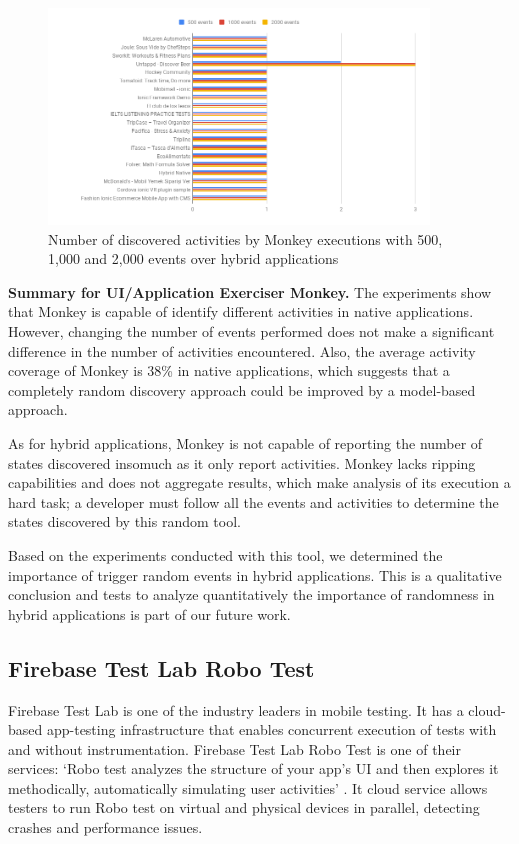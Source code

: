 \begin{figure}[t]
	\centering
	\includegraphics[width=0.9\textwidth]{img/monkeyHybrid.png}
	\caption{Number of discovered activities by Monkey executions with 500, 1,000 and 2,000 events over hybrid applications}
	
	\label{monkeyHybrid}
\end{figure} 

\textbf{Summary for UI/Application Exerciser Monkey.} The experiments show that Monkey is capable of identify different activities in native applications. However, changing the number of events performed does not make a significant difference in the number of activities encountered. Also, the average activity coverage of Monkey is 38\% in native applications, which suggests that a completely random discovery approach could be improved by a model-based approach.

As for hybrid applications, Monkey is not capable of reporting the number of states discovered insomuch as it only report activities. Monkey lacks ripping capabilities and does not aggregate results, which make analysis of its execution a hard task; a developer must follow all the events and activities to determine the states discovered by this random tool.

Based on the experiments conducted with this tool, we determined the importance of trigger random events in hybrid applications. This is a qualitative conclusion and tests to analyze quantitatively the importance of randomness in hybrid applications is part of our future work.

\subsection{Firebase Test Lab Robo Test}

Firebase Test Lab \cite{firebase} is one of the industry leaders in mobile testing. It has a cloud-based app-testing infrastructure that enables concurrent execution of tests with and without instrumentation. Firebase Test Lab Robo Test is one of their services: `Robo test analyzes the structure of your app's UI and then explores it methodically, automatically simulating user activities' \cite{firebase}. It cloud service allows testers to run Robo test on virtual and physical devices in parallel, detecting crashes and performance issues.

